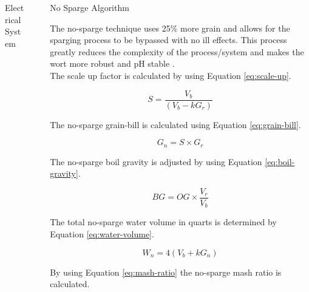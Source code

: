 \documentclass[final]{beamer}
\newlength{\sepwid}
\newlength{\onecolwid}
\newlength{\twocolwid}
\begin{document}
\begin{frame}[t]
\begin{columns}[t]
\begin{column}{\twocolwid}
\begin{block}{Electrical System}
\end{block}


\end{column} %

\begin{column}{\sepwid}\end{column} %

\begin{column}{\onecolwid} %


\begin{block}{No Sparge Algorithm}

The no-sparge technique uses 25\% more grain and allows for the sparging process to be bypassed with no ill effects.  This process greatly reduces the complexity of the process/system and makes the wort more robust and pH stable \cite{sparging}. \\

\noindent The scale up factor is calculated by using Equation \ref{eq:scale-up}.

\begin{equation}
S = \frac{V_{b}}{(V_{b} - kG_{r})}
\label{eq:scale-up}
\end{equation}

\noindent The no-sparge grain-bill is calculated using Equation \ref{eq:grain-bill}.

\begin{equation}
G_{n} = S \times G_{r}
\label{eq:grain-bill}
\end{equation}

\noindent The no-sparge boil gravity is adjusted by using Equation \ref{eq:boil-gravity}.

\begin{equation}
BG = OG \times \frac{V_{r}}{V_{b}}
\label{eq:boil-gravity}
\end{equation}

\noindent The total no-sparge water volume in quarts is determined by Equation \ref{eq:water-volume}.

\begin{equation}
W_{n} = 4(V_{b} + kG_{n})
\label{eq:water-volume}
\end{equation}

\noindent By using Equation \ref{eq:mash-ratio} the no-sparge mash ratio is calculated.


\end{block}
\end{column}
\end{columns}
\end{frame}
\end{document}
